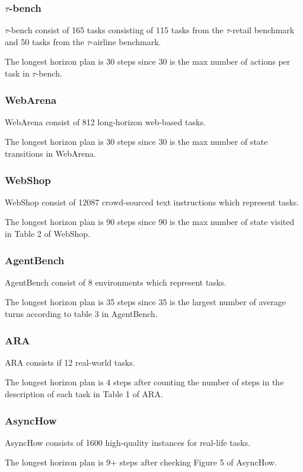 \subsubsection{$\tau$-bench}
$\tau$-bench consist of 165 tasks consisting of 115 tasks from the $\tau$-retail benchmark and 50 tasks from the $\tau$-airline benchmark.

The longest horizon plan is 30 steps since 30 is the max number of actions per task in $\tau$-bench.

\subsubsection{WebArena}
WebArena consist of 812 long-horizon web-based tasks.

The longest horizon plan is 30 steps since 30 is the max number of state transitions in WebArena.

\subsubsection{WebShop}
WebShop consist of 12087 crowd-sourced text instructions which represent tasks.

The longest horizon plan is 90 steps since 90 is the max number of state visited in Table 2 of WebShop.

\subsubsection{AgentBench}
AgentBench consist of 8 environments which represent tasks.

The longest horizon plan is 35 steps since 35 is the largest number of average turns according to table 3 in AgentBench.

\subsubsection{ARA}
ARA consists if 12 real-world tasks.

The longest horizon plan is 4 steps after counting the number of steps in the description of each task in Table 1 of ARA.

\subsubsection{AsyncHow}
AsyncHow consists of 1600 high-quality instances for real-life tasks.

The longest horizon plan is 9+ steps after checking Figure 5 of AsyncHow.

